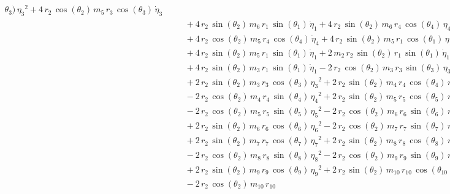 \begin{eqnarray*}
{\theta_{3}})\,{{\eta_{3}}}^2 + 4\,r_{2}\,\cos({\theta_{2}})\,m_{5}\,r
_{3}\,\cos({\theta_{3}})\,{\dot{\eta}_{3}} \\ &&\quad\mbox{} + 4\,r_{2
}\,\sin({\theta_{2}})\,m_{6}\,r_{1}\,\sin({\theta_{1}})\,{\dot{\eta}_{
1}} + 4\,r_{2}\,\sin({\theta_{2}})\,m_{6}\,r_{4}\,\cos({\theta_{4}})\,
{{\eta_{4}}}^2 \\ &&\quad\mbox{} + 4\,r_{2}\,\cos({\theta_{2}})\,m_{5}
\,r_{4}\,\cos({\theta_{4}})\,{\dot{\eta}_{4}} + 4\,r_{2}\,\sin({\theta
_{2}})\,m_{5}\,r_{1}\,\cos({\theta_{1}})\,{{\eta_{1}}}^2
 \\ &&\quad\mbox{} + 4\,r_{2}\,\sin({\theta_{2}})\,m_{5}\,r_{1}\,\sin(
{\theta_{1}})\,{\dot{\eta}_{1}} + 2\,m_{2}\,r_{2}\,\sin({\theta_{2}})
\,r_{1}\,\sin({\theta_{1}})\,{\dot{\eta}_{1}} \\ &&\quad\mbox{} + 4\,r
_{2}\,\sin({\theta_{2}})\,m_{3}\,r_{1}\,\sin({\theta_{1}})\,{
\dot{\eta}_{1}} - 2\,r_{2}\,\cos({\theta_{2}})\,m_{3}\,r_{3}\,\sin({
\theta_{3}})\,{{\eta_{3}}}^2 \\ &&\quad\mbox{} + 2\,r_{2}\,\sin({
\theta_{2}})\,m_{3}\,r_{3}\,\cos({\theta_{3}})\,{{\eta_{3}}}^2 + 2\,r
_{2}\,\sin({\theta_{2}})\,m_{4}\,r_{4}\,\cos({\theta_{4}})\,{{\eta_{4}
}}^2 \\ &&\quad\mbox{} - 2\,r_{2}\,\cos({\theta_{2}})\,m_{4}\,r_{4}\,
\sin({\theta_{4}})\,{{\eta_{4}}}^2 + 2\,r_{2}\,\sin({\theta_{2}})\,m_{
5}\,r_{5}\,\cos({\theta_{5}})\,{{\eta_{5}}}^2 \\ &&\quad\mbox{} - 2\,r
_{2}\,\cos({\theta_{2}})\,m_{5}\,r_{5}\,\sin({\theta_{5}})\,{{\eta_{5}
}}^2 - 2\,r_{2}\,\cos({\theta_{2}})\,m_{6}\,r_{6}\,\sin({\theta_{6}})
\,{{\eta_{6}}}^2 \\ &&\quad\mbox{} + 2\,r_{2}\,\sin({\theta_{2}})\,m_{
6}\,r_{6}\,\cos({\theta_{6}})\,{{\eta_{6}}}^2 - 2\,r_{2}\,\cos({\theta
_{2}})\,m_{7}\,r_{7}\,\sin({\theta_{7}})\,{{\eta_{7}}}^2
 \\ &&\quad\mbox{} + 2\,r_{2}\,\sin({\theta_{2}})\,m_{7}\,r_{7}\,\cos(
{\theta_{7}})\,{{\eta_{7}}}^2 + 2\,r_{2}\,\sin({\theta_{2}})\,m_{8}\,r
_{8}\,\cos({\theta_{8}})\,{{\eta_{8}}}^2 \\ &&\quad\mbox{} - 2\,r_{2}
\,\cos({\theta_{2}})\,m_{8}\,r_{8}\,\sin({\theta_{8}})\,{{\eta_{8}}}^2
 - 2\,r_{2}\,\cos({\theta_{2}})\,m_{9}\,r_{9}\,\sin({\theta_{9}})\,{{
\eta_{9}}}^2 \\ &&\quad\mbox{} + 2\,r_{2}\,\sin({\theta_{2}})\,m_{9}\,
r_{9}\,\cos({\theta_{9}})\,{{\eta_{9}}}^2 + 2\,r_{2}\,\sin({\theta_{2}
})\,m_{10}\,r_{10}\,\cos({\theta_{10}})\,{{\eta_{10}}}^2
 \\ &&\quad\mbox{} - 2\,r_{2}\,\cos({\theta_{2}})\,m_{10}\,r_{10}\,

\end{eqnarray*}
